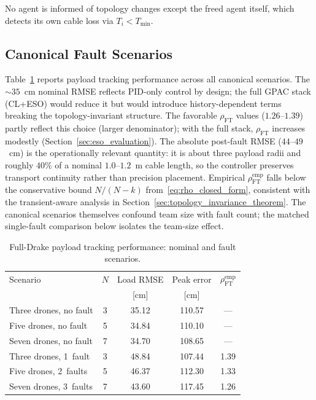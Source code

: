 No agent is informed of topology changes except the freed agent itself, which detects its own cable loss via $T_i < T_{\min}$.

\subsection{Canonical Fault Scenarios}
\label{sec:payload_tracking}

Table~\ref{tab:scenario_summary} reports payload tracking performance across all canonical scenarios. The ${\sim}35$~cm nominal RMSE reflects PID-only control by design; the full GPAC stack (CL+ESO) would reduce it but would introduce history-dependent terms breaking the topology-invariant structure. The favorable $\rho_{\mathrm{FT}}$ values ($1.26$--$1.39$) partly reflect this choice (larger denominator); with the full stack, $\rho_{\mathrm{FT}}$ increases modestly (Section~\ref{sec:eso_evaluation}). The absolute post-fault RMSE ($44$--$49$~cm) is the operationally relevant quantity: it is about three payload radii and roughly $40\%$ of a nominal $1.0$--$1.2$~m cable length, so the controller preserves transport continuity rather than precision placement. Empirical $\rho_{\mathrm{FT}}^{\mathrm{emp}}$ falls below the conservative bound $N/(N{-}k)$ from~\eqref{eq:rho_closed_form}, consistent with the transient-aware analysis in Section~\ref{sec:topology_invariance_theorem}. The canonical scenarios themselves confound team size with fault count; the matched single-fault comparison below isolates the team-size effect.

\begin{table}[t]
\centering
\caption{Full-Drake payload tracking performance: nominal and fault scenarios.}
\label{tab:scenario_summary}
\begin{tabular}{lcccc}
\toprule
Scenario & $N$ & Load RMSE & Peak error & $\rho_{\mathrm{FT}}^{\mathrm{emp}}$ \\
         &     & [cm]      & [cm]       &  \\
\midrule
Three drones, no fault  & 3 & 35.12 & 110.57 & --- \\
Five drones, no fault   & 5 & 34.84 & 110.10 & --- \\
Seven drones, no fault  & 7 & 34.70 & 108.65 & --- \\
\midrule
Three drones, 1~fault   & 3 & 48.84 & 107.44 & 1.39 \\
Five drones, 2~faults   & 5 & 46.37 & 112.30 & 1.33 \\
Seven drones, 3~faults  & 7 & 43.60 & 117.45 & 1.26 \\
\bottomrule
\end{tabular}
\end{table}

